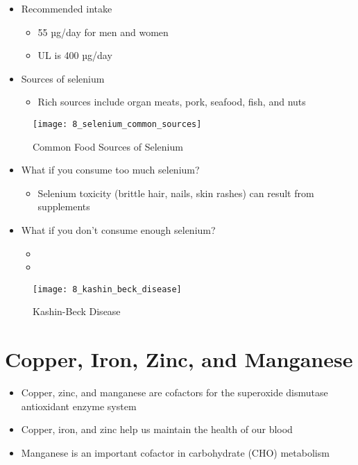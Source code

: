 \documentclass[title={Chapter 8}]{fdsn201notes}
\begin{document}
\begin{itemize}
	\item Recommended intake
	\begin{itemize}
		\item 55 µg/day for men and women
		\item UL is 400 µg/day
	\end{itemize}
	\item Sources of selenium
	\begin{itemize}
		\item Rich sources include organ meats, pork, seafood, fish, and nuts
	\end{itemize}
\end{itemize}

\begin{figure}[H]
	\centering
	\texttt{[image: 8\_selenium\_common\_sources]}
	\caption{Common Food Sources of Selenium}
	\label{fig:common-food-sources-of-selenium}
\end{figure}

\begin{itemize}
	\item What if you consume too much selenium?
	\begin{itemize}
		\item Selenium toxicity (brittle hair, nails, skin rashes) can result from supplements
	\end{itemize}
	\item What if you don’t consume enough selenium?
	\begin{itemize}
		\item {}
		\item {}
	\end{itemize}
\end{itemize}

\begin{figure}[H]
	\centering
	\texttt{[image: 8\_kashin\_beck\_disease]}
	\caption{Kashin-Beck Disease}
	\label{fig:kashin-beck-disease}
\end{figure}


\section{Copper, Iron, Zinc, and Manganese}\label{sec:copper-iron-zinc-and-manganese}
\begin{itemize}
	\item Copper, zinc, and manganese are cofactors for the superoxide dismutase antioxidant enzyme system
	\item Copper, iron, and zinc help us maintain the health of our blood
	\item Manganese is an important cofactor in carbohydrate (CHO) metabolism
\end{itemize}
\end{document}
